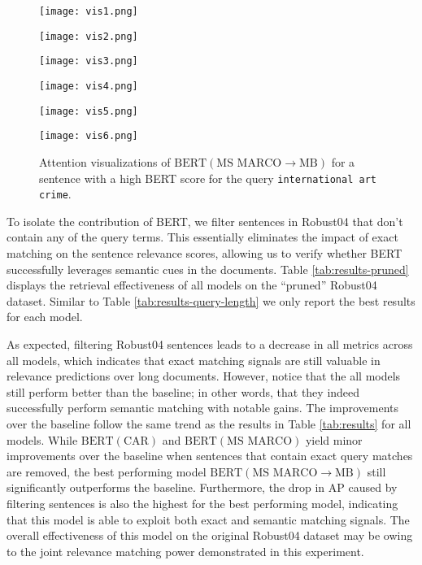 \begin{figure}
	\centering
    \begin{minipage}{0.3\textwidth}
        \centering
        \texttt{[image: vis1.png]}
    \end{minipage}\hfill
    \begin{minipage}{0.3\textwidth}
        \centering
        \texttt{[image: vis2.png]}
    \end{minipage}\hfill
    \begin{minipage}{0.3\textwidth}
        \centering
        \texttt{[image: vis3.png]}
    \end{minipage}
     \begin{minipage}{0.3\textwidth}
        \centering
        \texttt{[image: vis4.png]}
    \end{minipage}\hfill
    \begin{minipage}{0.3\textwidth}
        \centering
        \texttt{[image: vis5.png]}
    \end{minipage}\hfill
    \begin{minipage}{0.3\textwidth}
        \centering
        \texttt{[image: vis6.png]}
    \end{minipage}
\caption{Attention visualizations of $ \textrm{BERT} (\textrm{MS MARCO}\rightarrow\textrm{MB}) $ for a sentence with a high BERT score for the query \texttt{international art crime}.}
\label{fig:attention}
\end{figure}

To isolate the contribution of BERT, we filter sentences in Robust04 that don't contain any of the query terms.
This essentially eliminates the impact of exact matching on the sentence relevance scores, allowing us to verify whether BERT successfully leverages semantic cues in the documents.
Table \ref{tab:results-pruned} displays the retrieval effectiveness of all models on the ``pruned'' Robust04 dataset.
Similar to Table \ref{tab:results-query-length} we only report the best results for each model.

As expected, filtering Robust04 sentences leads to a decrease in all metrics across all models, which indicates that exact matching signals are still valuable in relevance predictions over long documents.
However, notice that the all models still perform better than the baseline; in other words, that they indeed successfully perform semantic matching with notable gains.
The improvements over the baseline follow the same trend as the results in Table \ref{tab:results} for all models.
While $ \textrm{BERT} (\textrm{CAR}) $ and $ \textrm{BERT} (\textrm{MS MARCO}) $ yield minor improvements over the baseline when sentences that contain exact query matches are removed, the best performing model $ \textrm{BERT} (\textrm{MS MARCO}\rightarrow\textrm{MB}) $ still significantly outperforms the baseline.
Furthermore, the drop in AP caused by filtering sentences is also the highest for the best performing model, indicating that this model is able to exploit both exact and semantic matching signals.
The overall effectiveness of this model on the original Robust04 dataset may be owing to the joint relevance matching power demonstrated in this experiment.


